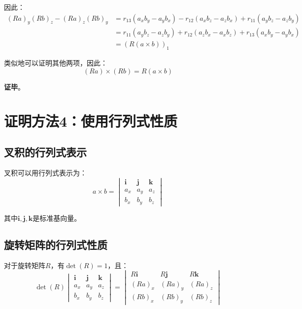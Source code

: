 \documentclass[12pt,a4paper]{article}
\begin{document}
因此：
\begin{align}
(Ra)_y (Rb)_z - (Ra)_z (Rb)_y &= r_{13}(a_x b_y - a_y b_x) - r_{12}(a_x b_z - a_z b_x) + r_{11}(a_y b_z - a_z b_y) \\
&= r_{11}(a_y b_z - a_z b_y) + r_{12}(a_z b_x - a_x b_z) + r_{13}(a_x b_y - a_y b_x) \\
&= (R(a \times b))_1
\end{align}

类似地可以证明其他两项，因此：
\begin{equation}
(Ra) \times (Rb) = R(a \times b)
\end{equation}

\textbf{证毕}。

\section{证明方法4：使用行列式性质}

\subsection{叉积的行列式表示}

叉积可以用行列式表示为：
\begin{equation}
a \times b = \begin{vmatrix}
\mathbf{i} & \mathbf{j} & \mathbf{k} \\
a_x & a_y & a_z \\
b_x & b_y & b_z
\end{vmatrix}
\end{equation}

其中$\mathbf{i}, \mathbf{j}, \mathbf{k}$是标准基向量。

\subsection{旋转矩阵的行列式性质}

对于旋转矩阵$R$，有$\det(R) = 1$，且：
\begin{equation}
\det(R) \begin{vmatrix}
\mathbf{i} & \mathbf{j} & \mathbf{k} \\
a_x & a_y & a_z \\
b_x & b_y & b_z
\end{vmatrix} = \begin{vmatrix}
R\mathbf{i} & R\mathbf{j} & R\mathbf{k} \\
(Ra)_x & (Ra)_y & (Ra)_z \\
(Rb)_x & (Rb)_y & (Rb)_z
\end{vmatrix}
\end{equation}
\end{document}
